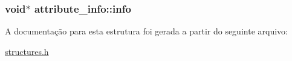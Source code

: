 \subsubsection[{\texorpdfstring{info}{info}}]{\setlength{\rightskip}{0pt plus 5cm}void$\ast$ attribute\+\_\+info\+::info}\hypertarget{structattribute__info_a7f168925308e418b7b44c9f11fdf42ae}{}\label{structattribute__info_a7f168925308e418b7b44c9f11fdf42ae}


A documentação para esta estrutura foi gerada a partir do seguinte arquivo\+:\begin{DoxyCompactItemize}
\item 
\hyperlink{structures_8h}{structures.\+h}\end{DoxyCompactItemize}
